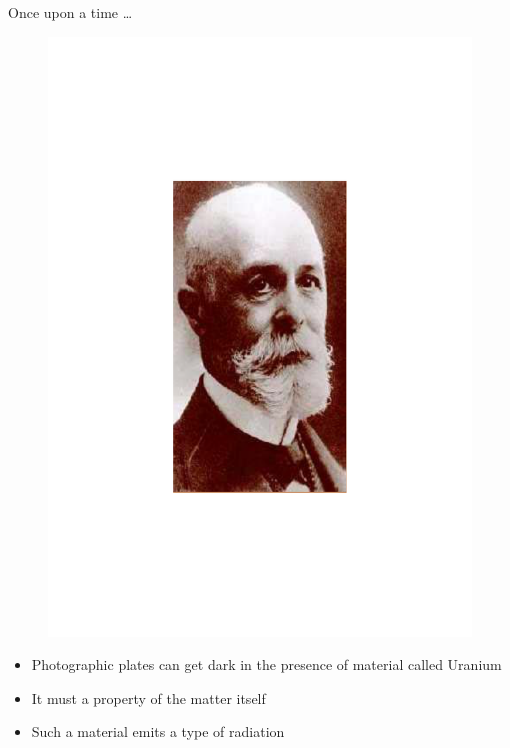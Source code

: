 \begin{frame}{Once upon a time \ldots}

\begin{figure}
\vskip-2cm
\centering
\includegraphics[scale=0.3]{figures/20160216_rsw_becquerel.pdf}
\end{figure}
\vskip-2cm
\begin{itemize}
\item Photographic plates can get dark in the presence of material called Uranium
\item It must a property of the matter itself
\item Such a material emits a type of radiation	
\end{itemize}

\end{frame}


